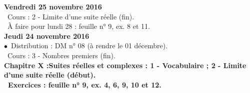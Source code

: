 \documentclass[12pt,a4paper]{article}
\begin{document}
%  
%  
%  
%   
%   




\noindent\textbf{Vendredi 25 novembre 2016 }\\
\bu\ Cours : 2 - Limite d'une suite réelle (fin).\\
\bu\ À faire pour lundi 28 : feuille n° 9, ex. 8 et 11.\vspace{.4cm}\\

\noindent\textbf{Jeudi 24 novembre 2016 }\\
$\bullet$\ Distribution : DM n° 08 (à rendre le 01 décembre).\\
\bu\ Cours : 3 - Nombres premiers (fin).\\
\bf Chapitre X :\rm Suites réelles et complexes : 1 - Vocabulaire ; 2 - Limite 
d'une suite réelle (début).\\
\bu\ Exercices : feuille n° 9, ex. 4, 6, 9, 10 et 12.\vspace{.4cm}\\
\end{document}
